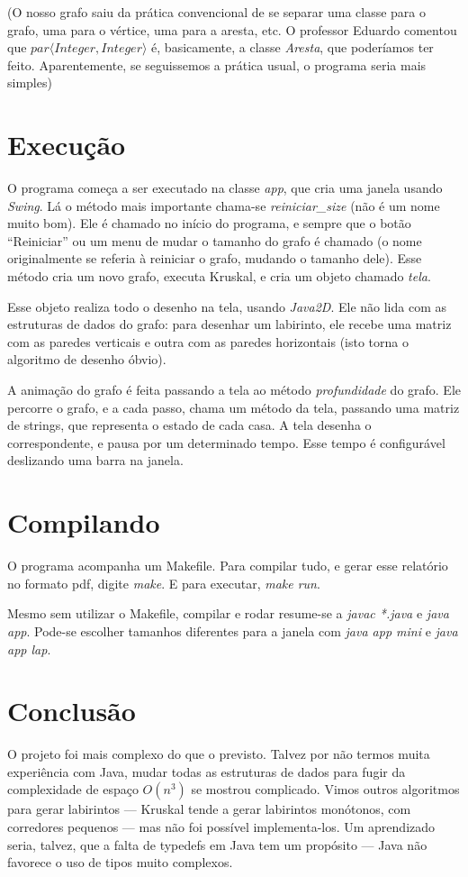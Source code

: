 \documentclass{article}
\begin{document}
(O nosso grafo saiu da prática convencional de se separar uma classe
para o grafo, uma para o vértice, uma para a aresta, etc. O professor
Eduardo comentou que \emph{$par \langle Integer, Integer \rangle$} é,
basicamente, a classe \emph{Aresta}, que poderíamos ter
feito. Aparentemente, se seguissemos a prática usual, o programa seria
mais simples)

\section*{Execução}

O programa começa a ser executado na classe \emph{app}, que cria uma
janela usando \emph{Swing}. Lá o método mais importante chama-se
\emph{reiniciar\_size} (não é um nome muito bom). Ele é chamado no
início do programa, e sempre que o botão ``Reiniciar'' ou um menu de
mudar o tamanho do grafo é chamado (o nome originalmente se referia à
reiniciar o grafo, mudando o tamanho dele). Esse método cria um novo
grafo, executa Kruskal, e cria um objeto chamado \emph{tela}.

Esse objeto realiza todo o desenho na tela, usando \emph{Java2D}. Ele
não lida com as estruturas de dados do grafo: para desenhar um
labirinto, ele recebe uma matriz com as paredes verticais e outra com as
paredes horizontais (isto torna o algoritmo de desenho óbvio).

A animação do grafo é feita passando a tela ao método
\emph{profundidade} do grafo. Ele percorre o grafo, e a cada passo,
chama um método da tela, passando uma matriz de strings, que representa
o estado de cada casa. A tela desenha o correspondente, e pausa por um
determinado tempo. Esse tempo é configurável deslizando uma barra na
janela.

\section*{Compilando}

O programa acompanha um Makefile. Para compilar tudo, e gerar esse
relatório no formato pdf, digite \emph{make}. E para executar,
\emph{make run}.

Mesmo sem utilizar o Makefile, compilar e rodar resume-se a \emph{javac
  *.java} e \emph{java app}. Pode-se escolher tamanhos diferentes para a
janela com \emph{java app mini} e \emph{java app lap}.

\section*{Conclusão}

O projeto foi mais complexo do que o previsto. Talvez por não termos
muita experiência com Java, mudar todas as estruturas de dados para
fugir da complexidade de espaço \emph{$O(n^3)$} se mostrou
complicado. Vimos outros algoritmos para gerar labirintos --- Kruskal
tende a gerar labirintos monótonos, com corredores pequenos --- mas não
foi possível implementa-los. Um aprendizado seria, talvez, que a falta
de typedefs em Java tem um propósito --- Java não favorece o uso de
tipos muito complexos.
\end{document}
